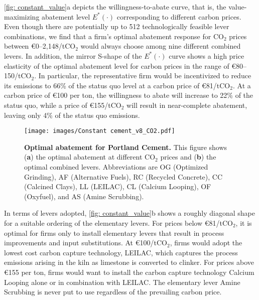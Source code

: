 \documentclass[12pt, a4paper]{article} %
\begin{document}
\autoref{fig: constant_value}a depicts the willingness-to-abate curve, that is, the value-maximizing abatement level $E^*(\cdot)$ corresponding to different carbon prices. Even though there are potentially up to 512 technologically feasible lever combinations, we find that a firm's optimal abatement response for CO$_2$ prices between \euro 0--2,148/tCO$_2$ would always choose among nine different combined levers. In addition, the mirror S-shape of the $E^*(\cdot)$ curve shows a high price elasticity of the optimal abatement level for carbon prices in the range of \euro 80--150/tCO$_2$. In particular, the representative firm would be incentivized to reduce its emissions to 66\% of the status quo level at a carbon price of \euro 81/tCO$_2$. At a carbon price of \euro 100 per ton, the willingness to abate will increase to 22\% of the status quo, while a price of \euro 155/tCO$_2$ will result in near-complete abatement, leaving only 4\% of the status quo emissions.

\begin{figure}[ht]
\centering
\texttt{[image: images/Constant cement\_v8\_CO2.pdf]}
\caption{\textbf{Optimal abatement for Portland Cement.} This figure shows (\textbf{a}) the optimal abatement at different CO$_2$ prices and (\textbf{b}) the optimal combined levers. Abbreviations are OG (Optimized Grinding), AF (Alternative Fuels), RC (Recycled Concrete), CC (Calcined Clays), LL (LEILAC), CL (Calcium Looping), OF (Oxyfuel), and AS (Amine Scrubbing).}
\label{fig: constant_value}
\end{figure}

In terms of levers adopted,  \autoref{fig: constant_value}b shows a roughly diagonal shape for a suitable ordering of the elementary levers. For prices below \euro 81/tCO$_2$, it is optimal for firms only to install elementary levers that result in process improvements and input substitutions. At \euro 100/tCO$_2$, firms would adopt the lowest cost carbon capture technology, LEILAC, which captures the process emissions arising in the kiln as limestone is converted to clinker. For prices above \euro 155 per ton, firms would want to install the carbon capture technology Calcium Looping alone or in combination with LEILAC. The elementary lever Amine Scrubbing is never put to use regardless of the prevailing carbon price.
\end{document}
